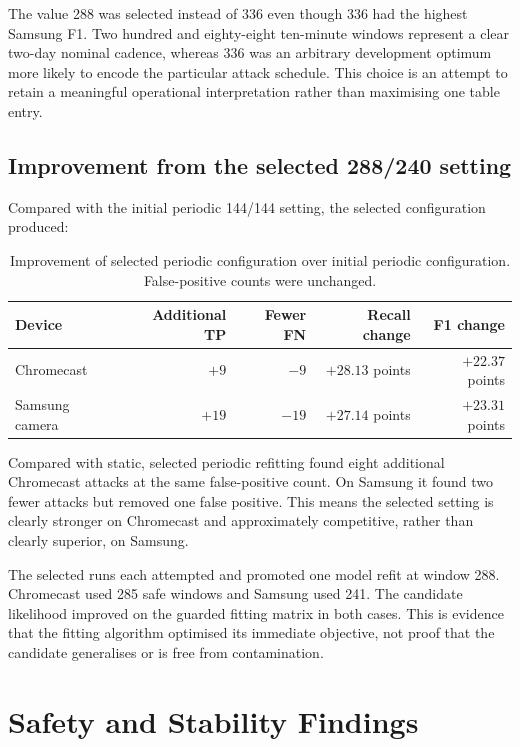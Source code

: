 \documentclass[11pt,a4paper]{article}
\begin{document}
The value 288 was selected instead of 336 even though 336 had the highest
Samsung F1. Two hundred and eighty-eight ten-minute windows represent a clear
two-day nominal cadence, whereas 336 was an arbitrary development optimum more
likely to encode the particular attack schedule. This choice is an attempt to
retain a meaningful operational interpretation rather than maximising one
table entry.

\subsection{Improvement from the selected 288/240 setting}

Compared with the initial periodic 144/144 setting, the selected configuration
produced:

\begin{table}[ht]
\centering
\small
\begin{tabular}{lrrrr}
\toprule
\textbf{Device} & \textbf{Additional TP} & \textbf{Fewer FN} &
\textbf{Recall change} & \textbf{F1 change} \\
\midrule
Chromecast & $+9$ & $-9$ & $+28.13$ points & $+22.37$ points \\
Samsung camera & $+19$ & $-19$ & $+27.14$ points & $+23.31$ points \\
\bottomrule
\end{tabular}
\caption{Improvement of selected periodic configuration over initial periodic
configuration. False-positive counts were unchanged.}
\label{tab:tuning-improvement}
\end{table}

Compared with static, selected periodic refitting found eight additional
Chromecast attacks at the same false-positive count. On Samsung it found two
fewer attacks but removed one false positive. This means the selected setting
is clearly stronger on Chromecast and approximately competitive, rather than
clearly superior, on Samsung.

The selected runs each attempted and promoted one model refit at window 288.
Chromecast used 285 safe windows and Samsung used 241. The candidate likelihood
improved on the guarded fitting matrix in both cases. This is evidence that the
fitting algorithm optimised its immediate objective, not proof that the
candidate generalises or is free from contamination.

\section{Safety and Stability Findings}
\label{sec:safety-findings}
\end{document}
